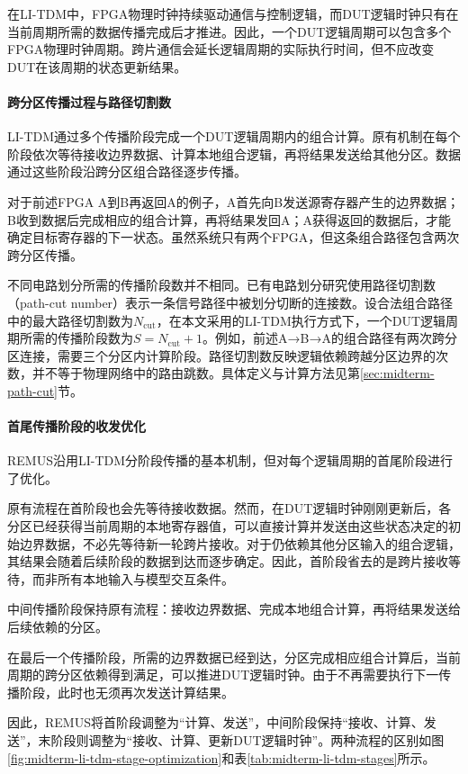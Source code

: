 在LI-TDM中，FPGA物理时钟持续驱动通信与控制逻辑，而DUT逻辑时钟只有在当前周期所需的数据传播完成后才推进。因此，一个DUT逻辑周期可以包含多个FPGA物理时钟周期。跨片通信会延长逻辑周期的实际执行时间，但不应改变DUT在该周期的状态更新结果。

\paragraph{跨分区传播过程与路径切割数}

LI-TDM通过多个传播阶段完成一个DUT逻辑周期内的组合计算。原有机制在每个阶段依次等待接收边界数据、计算本地组合逻辑，再将结果发送给其他分区。数据通过这些阶段沿跨分区组合路径逐步传播。

对于前述FPGA A到B再返回A的例子，A首先向B发送源寄存器产生的边界数据；B收到数据后完成相应的组合计算，再将结果发回A；A获得返回的数据后，才能确定目标寄存器的下一状态。虽然系统只有两个FPGA，但这条组合路径包含两次跨分区传播。

不同电路划分所需的传播阶段数并不相同。已有电路划分研究使用路径切割数（path-cut number）表示一条信号路径中被划分切断的连接数\cite{sait_evolutionary_2002}。设合法组合路径中的最大路径切割数为$N_{\mathrm{cut}}$，在本文采用的LI-TDM执行方式下，一个DUT逻辑周期所需的传播阶段数为$S=N_{\mathrm{cut}}+1$。例如，前述A→B→A的组合路径有两次跨分区连接，需要三个分区内计算阶段。路径切割数反映逻辑依赖跨越分区边界的次数，并不等于物理网络中的路由跳数。具体定义与计算方法见第\ref{sec:midterm-path-cut}节。

\paragraph{首尾传播阶段的收发优化}

REMUS沿用LI-TDM分阶段传播的基本机制，但对每个逻辑周期的首尾阶段进行了优化。

原有流程在首阶段也会先等待接收数据。然而，在DUT逻辑时钟刚刚更新后，各分区已经获得当前周期的本地寄存器值，可以直接计算并发送由这些状态决定的初始边界数据，不必先等待新一轮跨片接收。对于仍依赖其他分区输入的组合逻辑，其结果会随着后续阶段的数据到达而逐步确定。因此，首阶段省去的是跨片接收等待，而非所有本地输入与模型交互条件。

中间传播阶段保持原有流程：接收边界数据、完成本地组合计算，再将结果发送给后续依赖的分区。

在最后一个传播阶段，所需的边界数据已经到达，分区完成相应组合计算后，当前周期的跨分区依赖得到满足，可以推进DUT逻辑时钟。由于不再需要执行下一传播阶段，此时也无须再次发送计算结果。

因此，REMUS将首阶段调整为“计算、发送”，中间阶段保持“接收、计算、发送”，末阶段则调整为“接收、计算、更新DUT逻辑时钟”。两种流程的区别如图\ref{fig:midterm-li-tdm-stage-optimization}和表\ref{tab:midterm-li-tdm-stages}所示。

